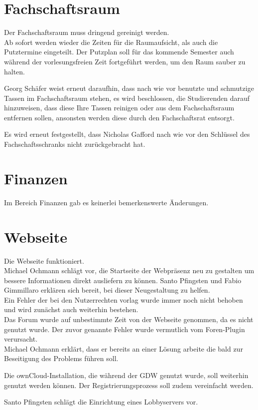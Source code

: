 \documentclass[a4paper, 11pt]{article} %
\begin{document}
\section{Fachschaftsraum}
Der Fachschaftsraum muss dringend gereinigt werden.\\
Ab sofort werden wieder die Zeiten für die Raumaufsicht, als auch die Putztermine eingeteilt.
Der Putzplan soll für das kommende Semester auch während der vorlesungsfreien Zeit fortgeführt werden, um den Raum sauber zu halten.
\begin{flushleft}
Georg Schäfer weist erneut daraufhin, dass nach wie vor benutzte und schmutzige Tassen im Fachschaftsraum stehen, es wird beschlossen, die Studierenden darauf hinzuweisen, dass diese Ihre Tassen reinigen oder aus dem Fachschaftsraum entfernen sollen, ansonsten werden diese durch den Fachschaftsrat entsorgt.
\end{flushleft}
\begin{flushleft}
Es wird erneut festgestellt, dass Nicholas Gafford nach wie vor den Schlüssel des Fachschaftsschranks nicht zurückgebracht hat.
\end{flushleft}

\section{Finanzen}
Im Bereich Finanzen gab es keinerlei bemerkenswerte Änderungen.

\section{Webseite}
Die Webseite funktioniert.\\
Michael Ochmann schlägt vor, die Startseite der Webpräsenz neu zu gestalten um bessere Informationen direkt ausliefern zu können. Santo Pfingsten und Fabio Gimmillaro erklären sich bereit, bei dieser Neugestaltung zu helfen.\\
Ein Fehler der bei den Nutzerrechten vorlag wurde immer noch nicht behoben und wird zunächst auch weiterhin bestehen.\\
Das Forum wurde auf unbestimmte Zeit  von der Webseite genommen, da es nicht genutzt wurde. Der zuvor genannte Fehler wurde vermutlich vom Foren-Plugin verursacht.\\
Michael Ochmann erklärt, dass er bereits an einer Lösung arbeite die bald zur Beseitigung des Problems führen soll.
\begin{flushleft}
	Die ownCloud-Installation, die während der GDW genutzt wurde, soll weiterhin genutzt werden können. Der Registrierungsprozess soll zudem vereinfacht werden.
\end{flushleft}
\begin{flushleft}
	Santo Pfingsten schlägt die Einrichtung eines Lobbyservers vor.
\end{flushleft}
\end{document}
